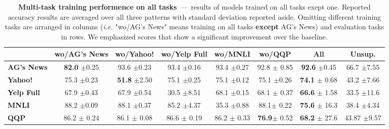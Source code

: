 \begin{table*}[ht]
	\centering
	\fontsize{9}{13}
	\selectfont
	\begin{tabular*}{\textwidth}{l@{\extracolsep{\fill}}ccccccc}
		\toprule
		& \textbf{wo/AG's News} & \textbf{wo/Yahoo!} & \textbf{wo/Yelp Full} & \textbf{wo/MNLI} & \textbf{wo/QQP} & \textbf{All} & \textbf{Unsup.} \\
		\hline
		\textbf{AG's News}    & \textbf{82.0} \tiny$\pm$0.25        & 93.6 \tiny$\pm$0.23        & 93.4   \tiny$\pm$0.16          & 93.4 \tiny$\pm$0.27       & 92.8 \tiny$\pm$ 0.85 & \textbf{92.6} \tiny$\pm$0.45 & 66.7 \tiny$\pm$7.55 \\
		\textbf{Yahoo!}     & 75.3 \tiny$\pm$0.23        & \textbf{51.8} \tiny$\pm$2.50        & 75.1   \tiny$\pm$0.25          & 75.1 \tiny$\pm$0.12       & 75.1 \tiny$\pm$0.26 & \textbf{74.1} \tiny$\pm$ 0.68  & 43.2 \tiny$\pm$7.66 \\
		\textbf{Yelp Full} & 67.9 \tiny$\pm$0.43        & 67.9 \tiny$\pm$0.54        & 30.5   \tiny$\pm$8.51          & 68.1 \tiny$\pm$0.15       & 68.1 \tiny$\pm$ 0.37 & \textbf{66.6} \tiny$\pm$ 1.58 & 33.5 \tiny$\pm$11.6 \\
		\textbf{MNLI}      & 88.2 \tiny$\pm$0.09        & 88.1 \tiny$\pm$0.37        & 85.2   \tiny$\pm$4.37          & 35.3 \tiny$\pm$0.88      & 88.1\tiny$\pm$ 0.22  & \textbf{75.6} \tiny$\pm$ 16.3 & 38.4 \tiny$\pm$4.34 \\
		\textbf{QQP}      &  86.2 \tiny$\pm$ 0.24        &  86.1 \tiny$\pm$ 0.08        &    86.6 \tiny$\pm$ 0.19          &  86.2 \tiny$\pm$ 0.33      & \textbf{76.9}\tiny$\pm$ 0.52  & \textbf{68.2} \tiny$\pm$ 27.6 & 43.87 \tiny$\pm$9.57\\
		\bottomrule
	\end{tabular*}
	\caption{\textbf{Multi-task training performence on all tasks}~---~results of models trained on all tasks exept one. Reported accuracy results are averaged over all three patterns with standard deviation reported aside. Omitting different training tasks are arranged in columns (\textit{i.e.} "wo/AG's News" means training on all tasks \textbf{except} AG's News) and evaluation tasks in rows. We emphasized scores that show a significant improvement over the baseline.}\label{tab:multi-on-train-set-summary}
	\vspace{-4mm}
\end{table*}
